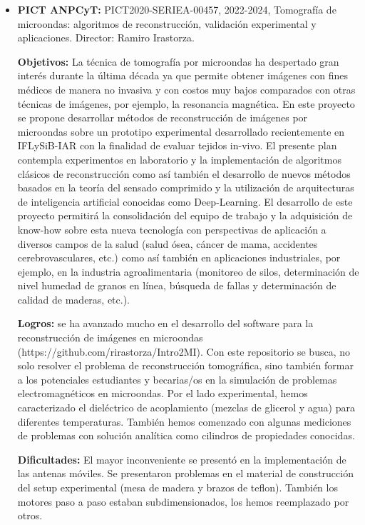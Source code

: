 \documentclass[a4paper,11pt,twoside,final,titlepage,onecolumn,openright]{report}
\begin{document}
\begin{itemize}
 {\bf Dificultades:} no se produjeron dificultades en el desarrollo del proyecto. 

\item \textbf{PICT ANPCyT:} PICT2020-SERIEA-00457, 2022-2024, Tomografía de microondas: algoritmos de reconstrucción, validación experimental y aplicaciones. Director: Ramiro Irastorza.

    \textbf{Objetivos:} La técnica de tomografía por microondas ha despertado gran interés durante la última década ya que permite obtener imágenes con fines médicos de manera no invasiva y con costos muy bajos comparados con otras técnicas de imágenes, por ejemplo, la resonancia magnética. En este proyecto se propone desarrollar métodos de reconstrucción de imágenes por microondas sobre un prototipo experimental desarrollado recientemente en IFLySiB-IAR con la finalidad de evaluar tejidos in-vivo. El presente plan contempla experimentos en laboratorio y la implementación de algoritmos clásicos de reconstrucción como así también el desarrollo de nuevos métodos basados en la teoría del sensado comprimido y la utilización de arquitecturas de inteligencia artificial conocidas como Deep-Learning. El desarrollo de este proyecto permitirá la consolidación del equipo de trabajo y la adquisición de know-how sobre esta nueva tecnología con perspectivas de aplicación a diversos campos de la salud (salud ósea, cáncer de mama, accidentes cerebrovasculares, etc.) como así también en aplicaciones industriales, por ejemplo, en la industria agroalimentaria (monitoreo de silos, determinación de nivel humedad de granos en línea, búsqueda de fallas y determinación de calidad de maderas, etc.).

    \textbf{Logros:} se ha avanzado mucho en el desarrollo del software para la reconstrucción de imágenes en microondas (https://github.com/rirastorza/Intro2MI). Con este repositorio se busca, no solo resolver el problema de reconstrucción tomográfica, sino también formar a los potenciales estudiantes y becarias/os en la simulación de problemas electromagnéticos en microondas. Por el lado experimental, hemos caracterizado el dieléctrico de acoplamiento (mezclas de glicerol y agua) para diferentes temperaturas. También hemos comenzado con algunas mediciones de problemas con solución analítica como cilindros de propiedades conocidas.

    \textbf{Dificultades:} El mayor inconveniente se presentó en la implementación de las antenas móviles. Se presentaron problemas en el material de construcción del setup experimental (mesa de madera y brazos de teflon). También los motores paso a paso estaban subdimensionados, los hemos reemplazado por otros.


\end{itemize}
\end{document}
